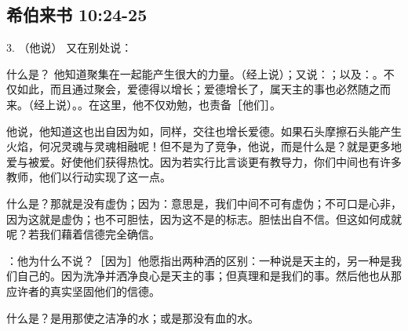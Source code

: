 
\subsection{希伯来书 10:24-25}

3. （他说） 又在别处说： \par

什么是？ 他知道聚集在一起能产生很大的力量。（经上说）；又说：；以及：。不仅如此，而且通过聚会，爱德得以增长；爱德增长了，属天主的事也必然随之而来。（经上说）。。在这里，他不仅劝勉，也责备［他们］。\par

他说，他知道这也出自因为如，同样，交往也增长爱德。如果石头摩擦石头能产生火焰，何况灵魂与灵魂相融呢！但不是为了竞争，他说，而是什么是？就是更多地爱与被爱。好使他们获得热忱。因为若实行比言谈更有教导力，你们中间也有许多教师，他们以行动实现了这一点。\par

什么是？那就是没有虚伪；因为：意思是，我们中间不可有虚伪；不可口是心非，因为这就是虚伪；也不可胆怯，因为这不是的标志。胆怯出自不信。但这如何成就呢？若我们藉着信德完全确信。\par

：他为什么不说？［因为］他愿指出两种洒的区别：一种说是天主的，另一种是我们自己的。因为洗净并洒净良心是天主的事；但真理和是我们的事。然后他也从那应许者的真实坚固他们的信德。\par

什么是？是用那使之洁净的水；或是那没有血的水。\par

